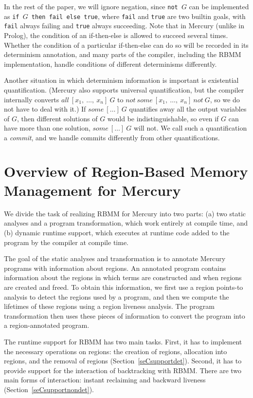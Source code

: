 \documentclass{tlp}
\newcommand{\code}[1]{{\tt#1}}
\begin{document}
In the rest of the paper, we will ignore negation, since \code{not~$G$} can
be implemented as \code{if $G$ then fail else true},
where \code{fail} and \code{true} are two builtin goals,
with \code{fail} always failing and \code{true} always succeeding.
Note that in Mercury (unlike in Prolog),
the condition of an if-then-else is allowed to succeed several times.
Whether the condition of a particular if-then-else can do so
will be recorded in its determinism annotation,
and many parts of the compiler, including the RBMM implementation,
handle conditions of different determinisms differently.

Another situation in which determinism information is important
is existential quantification.
(Mercury also supports universal quantification,
but the compiler internally converts ${all}~[x_1,~\ldots,~x_n]~G$
to ${not}~{some}~[x_1,~\ldots,~x_n]~{not}~G$,
so we do not have to deal with it.)
If ${some}~[\ldots]~G$ quantifies away all the output variables of $G$,
then different solutions of $G$ would be indistinguishable,
so even if $G$ can have more than one solution, ${some}~[\ldots]~G$ will not.
We call such a quantification a \emph{commit},
and we handle commits differently from other quantifications.

\section{Overview of Region-Based Memory Management for Mercury}
\label{seCbgCmercuryRBMM}

We divide the task of realizing RBMM for Mercury into two parts:
(a) two static analyses and a program transformation,
which work entirely at compile time,
and (b) dynamic runtime support, which executes at runtime
code added to the program by the compiler at compile time.

The goal of the static analyses and transformation
is to annotate Mercury programs with information about regions.
An annotated program contains information about the regions
in which terms are constructed and when regions are created and freed.
To obtain this information, we first use
a region points-to analysis to detect the regions used by a program,
and then we compute the lifetimes of these regions
using a region liveness analysis.
The program transformation then uses these pieces of information
to convert the program into a region-annotated program.

The runtime support for RBMM has two main tasks.
First, it has to implement the necessary operations on regions:
the creation of regions, allocation into regions, and the removal of regions
(Section~\ref{seCsupportdet}).
Second, it has to provide support
for the interaction of backtracking with RBMM.
There are two main forms of interaction:
instant reclaiming and backward liveness
(Section~\ref{seCsupportnondet}).
\end{document}
